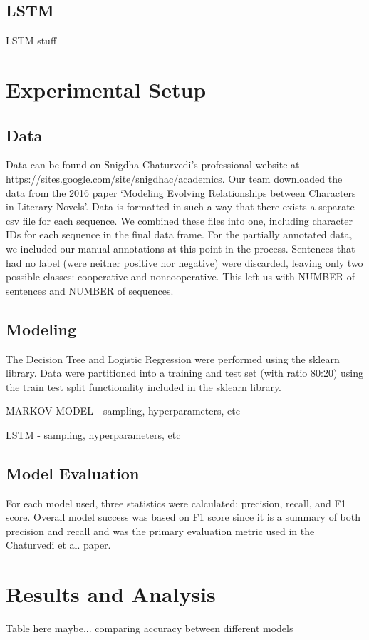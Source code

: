 \documentclass[11pt,a4paper]{article}
\begin{document}
\subsection{LSTM}
LSTM stuff 

\section{Experimental Setup}

\subsection{Data}
Data can be found on Snigdha Chaturvedi’s professional website at https://sites.google.com/site/snigdhac/academics. Our team downloaded the data from the 2016 paper ‘Modeling Evolving Relationships between Characters in Literary Novels’. Data is formatted in such a way that there exists a separate csv file for each sequence. We combined these files into one, including character IDs for each sequence in the final data frame. For the partially annotated data, we included our manual annotations at this point in the process. Sentences that had no label (were neither positive nor negative) were discarded, leaving only two possible classes: cooperative and noncooperative. This left us with NUMBER of sentences and NUMBER of sequences. 

\subsection{Modeling}
The Decision Tree and Logistic Regression were performed using the sklearn library. Data were partitioned into a training and test set (with ratio 80:20) using the train test split functionality included in the sklearn library. 

MARKOV MODEL - sampling, hyperparameters, etc 

LSTM - sampling, hyperparameters, etc 

\subsection{Model Evaluation}

For each model used, three statistics were calculated: precision, recall, and F1 score. Overall model success was based on F1 score since it is a summary of both precision and recall and was the primary evaluation metric used in the Chaturvedi et al. paper.

\section{Results and Analysis}
Table here maybe... comparing accuracy between different models 
\end{document}
